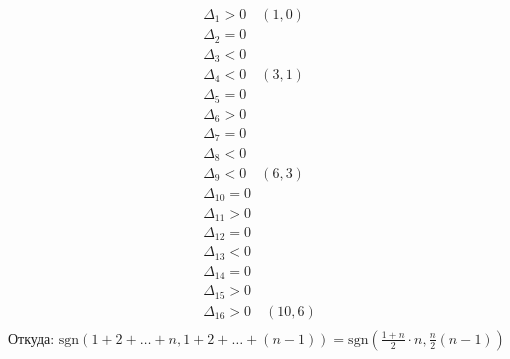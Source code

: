 \begin{enumerate}
	\begin{gather*}
		\Delta_{1} > 0\quad (1,0)\\
		\Delta_{2} = 0\\
		\Delta_{3} < 0\\
		\Delta_{4} < 0\quad (3,1)\\
		\Delta_{5} = 0\\
		\Delta_{6} > 0\\
		\Delta_{7} = 0\\
		\Delta_{8} < 0\\
		\Delta_{9} < 0\quad (6,3)\\
		\Delta_{10} = 0\\
		\Delta_{11} > 0\\
		\Delta_{12} = 0\\
		\Delta_{13} < 0\\
		\Delta_{14} = 0\\
		\Delta_{15} > 0\\
		\Delta_{16} > 0\quad (10,6)\\
	\end{gather*}
	Откуда: $\text{sgn}(1+2+\ldots+n, 1+2+\ldots+(n-1)) = \text{sgn}(\frac{1+n}{2}\cdot n, \frac{n}{2}(n-1))$
\end{enumerate}
		